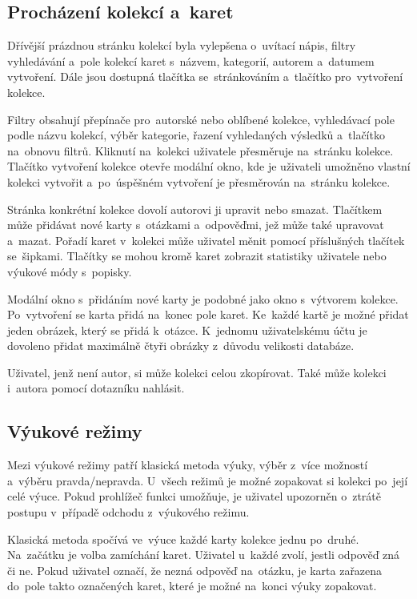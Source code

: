 \documentclass[twoside]{ctuthesis}
\begin{document}
\subsection{Procházení kolekcí a~karet}

Dřívější prázdnou stránku kolekcí byla vylepšena o~uvítací nápis, filtry vyhledávání a~pole kolekcí karet s~názvem, kategorií, autorem a~datumem vytvoření. Dále jsou dostupná tlačítka se~stránkováním a~tlačítko pro~vytvoření kolekce.

Filtry obsahují přepínače pro~autorské nebo oblíbené kolekce, vyhledávací pole podle názvu kolekcí, výběr kategorie, řazení vyhledaných výsledků a~tlačítko na~obnovu filtrů. Kliknutí na~kolekci uživatele přesměruje na~stránku kolekce. Tlačítko vytvoření kolekce otevře modální okno, kde je uživateli umožněno vlastní kolekci vytvořit a~po~úspěšném vytvoření je přesměrován na~stránku kolekce.

Stránka konkrétní kolekce dovolí autorovi ji upravit nebo smazat. Tlačítkem může přidávat nové karty s~otázkami a~odpověďmi, jež může také upravovat a~mazat. Pořadí karet v~kolekci může uživatel měnit pomocí příslušných tlačítek se~šipkami. Tlačítky se mohou kromě karet zobrazit statistiky uživatele nebo výukové módy s~popisky.

Modální okno s~přidáním nové karty je podobné jako okno s~výtvorem kolekce. Po~vytvoření se karta přidá na~konec pole karet. Ke~každé kartě je možné přidat jeden obrázek, který se přidá k~otázce. K~jednomu uživatelskému účtu je dovoleno přidat maximálně čtyři obrázky z~důvodu velikosti databáze.

Uživatel, jenž není autor, si může kolekci celou zkopírovat. Také může kolekci i~autora pomocí dotazníku nahlásit.

\subsection{Výukové režimy}

Mezi výukové režimy patří klasická metoda výuky, výběr z~více možností a~výběru pravda/nepravda. U~všech režimů je možné zopakovat si kolekci po~její celé výuce. Pokud prohlížeč funkci umožňuje, je uživatel upozorněn o~ztrátě postupu v~případě odchodu z~výukového režimu.

Klasická metoda spočívá ve~výuce každé karty kolekce jednu po~druhé. Na~začátku je volba zamíchání karet. Uživatel u~každé zvolí, jestli odpověď zná či ne. Pokud uživatel označí, že nezná odpověď na~otázku, je karta zařazena do~pole takto označených karet, které je možné na~konci výuky zopakovat.
\end{document}
